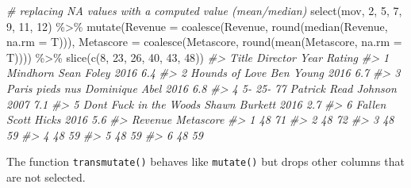 \documentclass[
]{book}
\newenvironment{Shaded}{\begin{snugshade}}{\end{snugshade}}
\newcommand{\AttributeTok}[1]{\textcolor[rgb]{0.77,0.63,0.00}{#1}}
\newcommand{\CommentTok}[1]{\textcolor[rgb]{0.56,0.35,0.01}{\textit{#1}}}
\newcommand{\DecValTok}[1]{\textcolor[rgb]{0.00,0.00,0.81}{#1}}
\newcommand{\FunctionTok}[1]{\textcolor[rgb]{0.00,0.00,0.00}{#1}}
\newcommand{\NormalTok}[1]{#1}
\newcommand{\SpecialCharTok}[1]{\textcolor[rgb]{0.00,0.00,0.00}{#1}}
\begin{document}
\begin{Shaded}
\begin{Highlighting}[]
\CommentTok{\# replacing NA values with a computed value (mean/median)}
\FunctionTok{select}\NormalTok{(mov, }\DecValTok{2}\NormalTok{, }\DecValTok{5}\NormalTok{, }\DecValTok{7}\NormalTok{, }\DecValTok{9}\NormalTok{, }\DecValTok{11}\NormalTok{, }\DecValTok{12}\NormalTok{) }\SpecialCharTok{\%\textgreater{}\%}
  \FunctionTok{mutate}\NormalTok{(}\AttributeTok{Revenue =} \FunctionTok{coalesce}\NormalTok{(Revenue, }\FunctionTok{round}\NormalTok{(}\FunctionTok{median}\NormalTok{(Revenue, }\AttributeTok{na.rm =}\NormalTok{ T))), }
         \AttributeTok{Metascore =} \FunctionTok{coalesce}\NormalTok{(Metascore, }\FunctionTok{round}\NormalTok{(}\FunctionTok{mean}\NormalTok{(Metascore, }\AttributeTok{na.rm =}\NormalTok{ T)))) }\SpecialCharTok{\%\textgreater{}\%}
  \FunctionTok{slice}\NormalTok{(}\FunctionTok{c}\NormalTok{(}\DecValTok{8}\NormalTok{, }\DecValTok{23}\NormalTok{, }\DecValTok{26}\NormalTok{, }\DecValTok{40}\NormalTok{, }\DecValTok{43}\NormalTok{, }\DecValTok{48}\NormalTok{))}
\CommentTok{\#\textgreater{}                     Title             Director Year Rating}
\CommentTok{\#\textgreater{} 1                Mindhorn           Sean Foley 2016    6.4}
\CommentTok{\#\textgreater{} 2          Hounds of Love            Ben Young 2016    6.7}
\CommentTok{\#\textgreater{} 3         Paris pieds nus       Dominique Abel 2016    6.8}
\CommentTok{\#\textgreater{} 4               5{-} 25{-} 77 Patrick Read Johnson 2007    7.1}
\CommentTok{\#\textgreater{} 5 Don\textquotesingle{}t Fuck in the Woods        Shawn Burkett 2016    2.7}
\CommentTok{\#\textgreater{} 6                  Fallen          Scott Hicks 2016    5.6}
\CommentTok{\#\textgreater{}   Revenue Metascore}
\CommentTok{\#\textgreater{} 1      48        71}
\CommentTok{\#\textgreater{} 2      48        72}
\CommentTok{\#\textgreater{} 3      48        59}
\CommentTok{\#\textgreater{} 4      48        59}
\CommentTok{\#\textgreater{} 5      48        59}
\CommentTok{\#\textgreater{} 6      48        59}
\end{Highlighting}
\end{Shaded}

The function \texttt{transmutate()} behaves like \texttt{mutate()} but drops other columns that are not selected.
\end{document}
